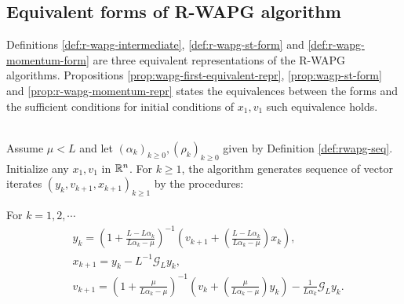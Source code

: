 \documentclass[12pt]{article}
\begin{document}
    \subsection{Equivalent forms of R-WAPG algorithm}\label{ssec:quiv-repr-rwapg}
        Definitions \ref{def:r-wapg-intermediate}, \ref{def:r-wapg-st-form} and \ref{def:r-wapg-momentum-form} are three equivalent representations of the R-WAPG algorithms. 
        Propositions \ref{prop:wapg-first-equivalent-repr}, \ref{prop:wagp-st-form} and \ref{prop:r-wapg-momentum-repr} states the equivalences between the forms and the sufficient conditions for initial conditions of $x_1, v_1$ such equivalence holds. 
        \begin{definition}\label{def:r-wapg-intermediate}\;\\
            Assume $\mu < L$ and let $(\alpha_k)_{k \ge 0}, (\rho_k)_{k \ge 0}$ given by Definition \ref{def:rwapg-seq}. 
            Initialize any $x_1, v_1$ in $\mathbb R^n$. 
            For $k \ge 1$, the algorithm generates sequence of vector iterates $(y_{k}, v_{k + 1}, x_{k + 1})_{k \ge 1}$ by the procedures: 
            \begin{tcolorbox}
                For $k = 1, 2, \cdots$
                \begin{align*} 
                    & y_{k} = 
                    \left(
                        1 + \frac{L - L\alpha_{k}}{L\alpha_{k} - \mu}
                    \right)^{-1}
                    \left(
                        v_{k + 1} + 
                        \left(\frac{L - L\alpha_{k}}{L\alpha_{k} - \mu} \right) x_{k}
                    \right), 
                    \\
                    & x_{k + 1} = 
                    y_k - L^{-1} \mathcal G_L y_k, 
                    \\
                    & v_{k + 1} = 
                    \left(
                        1 + \frac{\mu}{L \alpha_k - \mu}
                    \right)^{-1}
                    \left(
                        v_k + 
                        \left(\frac{\mu}{L \alpha_k - \mu}\right) y_k
                    \right) - \frac{1}{L\alpha_{k}}\mathcal G_L y_k. 
                \end{align*}
            \end{tcolorbox}
        \end{definition}
\end{document}

